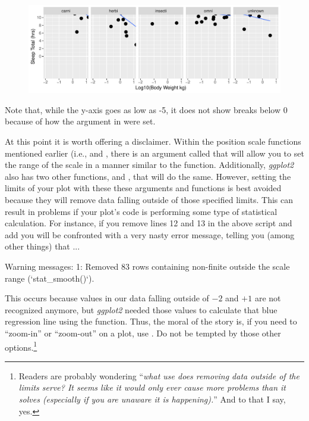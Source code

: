 \vspace{2em}

\begin{figure}[H]
\includegraphics[scale = .75]{graphics/ch2Figs/ggEx_19.pdf}
\end{figure}

\noindent
Note that, while the y-axis goes as low as -5, it does not show breaks below 0 because of how the  argument in  were set.

At this point it is worth offering a disclaimer.  Within the position scale functions mentioned earlier (i.e.,  and , there is an argument called  that will allow you to set the range of the scale in a manner similar to the  function. Additionally, \textit{ggplot2} also has two other functions,  and , that will do the same. However, setting the limits of your plot with these these arguments and functions is best avoided because they will remove data falling outside of those specified limits. This can result in problems if your plot's code is performing some type of statistical calculation. For instance, if you remove lines 12 and 13 in the above script and add  you will be confronted with a very nasty error message, telling you (among other things) that ...

\begin{outR}
Warning messages:
1: Removed 83 rows containing non-finite outside the scale range
(`stat_smooth()`). 
\end{outR}

\noindent
This occurs because values in our data falling outside of $-2$ and $+1$ are not recognized anymore, but \textit{ggplot2} needed those values to calculate that blue regression line using the  function. Thus, the moral of the story is, if you need to ``zoom-in'' or ``zoom-out'' on a plot, use . Do not be tempted by those other options.\footnote{Readers are probably wondering ``\textit{what use does removing data outside of the limits serve? It seems like it would only ever cause more problems than it solves (especially if you are unaware it is happening).}'' And to that I say, yes.}

